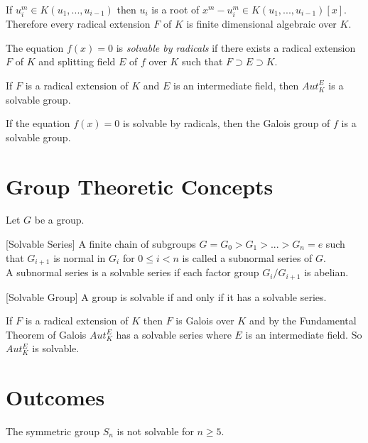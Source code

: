 \begin{remark} \cite{hunger}
If \(u_i^m \in K(u_1,...,u_{i-1})\) then \(u_i\) is a root of \(x^m-u_i^m \in K(u_1,...,u_{i-1})[x]\). \\
Therefore every radical extension \(F\) of \(K\) is finite dimensional algebraic over \(K\).
\end{remark}

\begin{definition} \cite{hunger}
  The equation \(f(x)=0\) is \textit{solvable by radicals} if there exists a radical extension \(F\) of \(K\) and splitting field \(E\) of \(f\) over \(K\) such that \(F \supset E \supset K\).
\end{definition}

\begin{theorem} \cite{hunger}
If \(F\) is a radical extension of \(K\) and \(E\) is an intermediate field, then \(Aut_K^E\) is a solvable group.
\end{theorem}

\begin{corollary} \cite{hunger}
If the equation \(f(x)=0\) is solvable by radicals, then the Galois group of \(f\) is a solvable group.
\end{corollary}

\section{Group Theoretic Concepts}
Let \(G\) be a group.

\begin{definition} \cite{hunger} [Solvable Series]
A finite chain of subgroups \(G=G_0>G_1>...>G_n={e}\) such that \(G_{i+1}\) is normal in \(G_i\) for \(0 \leq i < n\) is called a subnormal series of \(G\).\\
A subnormal series is a solvable series if each factor group \(G_i/G_{i+1}\) is abelian.
\end{definition}

\begin{definition} \cite{hunger} [Solvable Group]
 A group is solvable if and only if it has a solvable series.
\end{definition}

If \(F\) is a radical extension of \(K\) then \(F\) is Galois over \(K\) and by the Fundamental Theorem of Galois \(Aut_K^E\) has a solvable series where \(E\) is an intermediate field. So \(Aut_K^E\) is solvable.

\section{Outcomes}
\begin{theorem} \cite{hunger}
The symmetric group \(S_n\) is not solvable for \(n \geq 5\).
\end{theorem}

